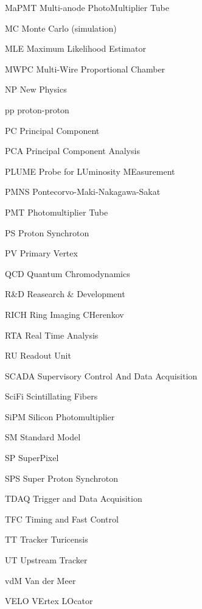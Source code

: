 \begin{abbreviations}
    \item[MaPMT] Multi-anode PhotoMultiplier Tube
    \item[MC] Monte Carlo (simulation)
    \item[MLE] Maximum Likelihood Estimator
    \item[MWPC] Multi-Wire Proportional Chamber
    \item[NP] New Physics
    \item[pp] proton-proton
    \item[PC] Principal Component
    \item[PCA] Principal Component Analysis
    \item[PLUME] Probe for LUminosity MEasurement
    \item[PMNS] Pontecorvo-Maki-Nakagawa-Sakat
    \item[PMT] Photomultiplier Tube
    \item[PS] Proton Synchroton
    \item[PV] Primary Vertex
    \item[QCD] Quantum Chromodynamics
    \item[R\&D] Reasearch \& Development
    \item[RICH] Ring Imaging CHerenkov
    \item[RTA] Real Time Analysis
    \item[RU] Readout Unit
    \item[SCADA] Supervisory Control And Data Acquisition
    \item[SciFi] Scintillating Fibers
    \item[SiPM] Silicon Photomultiplier
    \item[SM] Standard Model
    \item[SP] SuperPixel
    \item[SPS] Super Proton Synchroton
    \item[TDAQ] Trigger and Data Acquisition
    \item[TFC] Timing and Fast Control
    \item[TT] Tracker Turicensis
    \item[UT] Upstream Tracker
    \item[vdM] Van der Meer
    \item[VELO] VErtex LOcator
\end{abbreviations}

